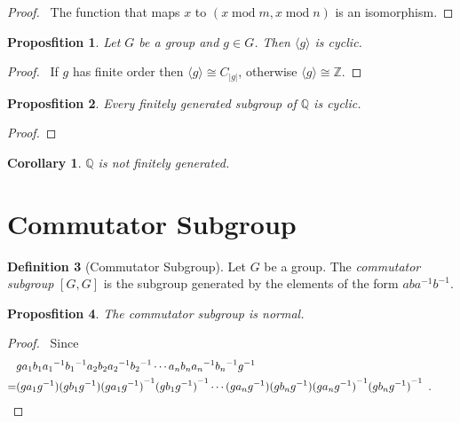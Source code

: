\documentclass{book}
\let\qed\relax
\newtheorem{prop}{Proposfition}[chapter]
\newtheorem{cor}{Corollary}[prop]
\theoremstyle{definition}
\newtheorem{df}[prop]{Definition}
\newcommand{\inv}[1]{\ensuremath{{#1}^{-1}}}
\renewcommand{\mod}{\ensuremath{\operatorname{mod}}}
\begin{document}
\begin{proof}
    \pf\ The function that maps $x$ to $(x \mod m, x \mod n)$ is an isomorphism. \qed
\end{proof}

\begin{prop}
Let $G$ be a group and $g \in G$. Then $\langle g \rangle$ is cyclic.
\end{prop}

\begin{proof}
\pf\ If $g$ has finite order then $\langle g \rangle \cong C_{|g|}$, otherwise $\langle g \rangle \cong \mathbb{Z}$. \qed
\end{proof}

\begin{prop}
Every finitely generated subgroup of $\mathbb{Q}$ is cyclic.
\end{prop}

\begin{proof}
\pf
{}
\qed
\end{proof}

\begin{cor}
$\mathbb{Q}$ is not finitely generated.
\end{cor}

\section{Commutator Subgroup}

\begin{df}[Commutator Subgroup]
Let $G$ be a group. The \emph{commutator subgroup} $[G,G]$ is the subgroup generated by the elements of the form $ab\inv{a}\inv{b}$.
\end{df}

\begin{prop}
The commutator subgroup is normal.
\end{prop}

\begin{proof}
\pf\ Since
\begin{align*} 
& g a_1 b_1 \inv{a_1} \inv{b_1} a_2 b_2 \inv{a_2} \inv{b_2} \cdots a_n b_n \inv{a_n} \inv{b_n} \inv{g} \\
= & (g a_1 \inv{g}) (g b_1 \inv{g}) \inv{(g a_1 \inv{g})} \inv{(g b_1 \inv{g})} \cdots (g a_n \inv{g}) (g b_n \inv{g}) \inv{(g a_n \inv{g})} \inv{(g b_n \inv{g})} \enspace . \qquad \qed
\end{align*}
\end{proof}
\end{document}
